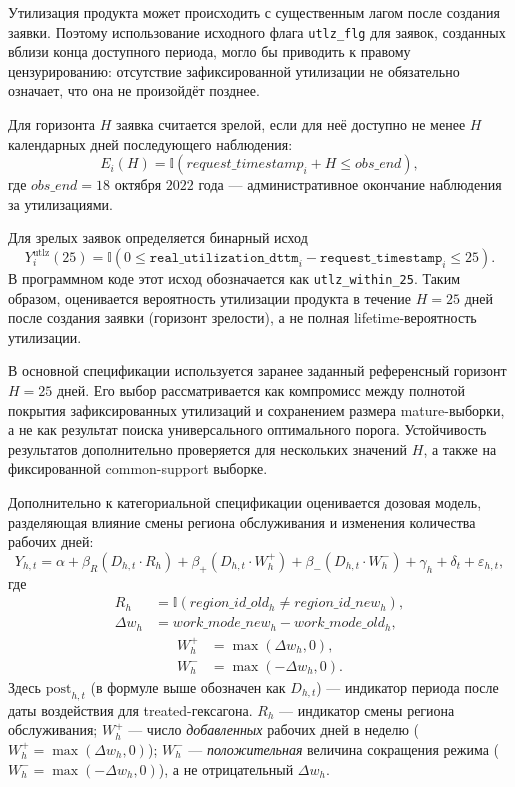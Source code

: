 \documentclass[14pt,a4paper]{extarticle}
\begin{document}
Утилизация продукта может происходить с существенным лагом после создания
заявки. Поэтому использование исходного флага \texttt{utlz\_flg} для заявок,
созданных вблизи конца доступного периода, могло бы приводить к правому
цензурированию: отсутствие зафиксированной утилизации не обязательно означает,
что она не произойдёт позднее.

Для горизонта \(H\) заявка считается зрелой, если для неё доступно не менее
\(H\) календарных дней последующего наблюдения:
\[
E_i(H)
=
\mathbb{I}
\left(
request\_timestamp_i + H
\leq obs\_end
\right),
\]
где \(obs\_end=\text{18 октября 2022 года}\) --- административное окончание
наблюдения за утилизациями.

Для зрелых заявок определяется бинарный исход
\[
Y_i^{\mathrm{utlz}}(25)
=
\mathbb{I}
\left(
0 \leq
\texttt{real\_utilization\_dttm}_i
-
\texttt{request\_timestamp}_i
\leq 25
\right).
\]
В программном коде этот исход обозначается как \texttt{utlz\_within\_25}. Таким образом, оценивается вероятность утилизации продукта в течение \(H=25\) дней после создания заявки (горизонт зрелости), а не полная lifetime-вероятность утилизации.

В основной спецификации используется заранее заданный референсный горизонт
\(H=25\) дней. Его выбор рассматривается как компромисс между полнотой
покрытия зафиксированных утилизаций и сохранением размера mature-выборки,
а не как результат поиска универсального оптимального порога. Устойчивость
результатов дополнительно проверяется для нескольких значений \(H\), а также
на фиксированной common-support выборке.

Дополнительно к категориальной спецификации оценивается дозовая модель, разделяющая влияние смены региона обслуживания и изменения количества рабочих дней:
\[
Y_{h,t}
=
\alpha
+
\beta_R(D_{h,t} \cdot R_h)
+
\beta_+(D_{h,t} \cdot W_h^+)
+
\beta_-(D_{h,t} \cdot W_h^-)
+
\gamma_h
+
\delta_t
+
\varepsilon_{h,t},
\]
где
\[
\begin{aligned}
R_h &= \mathbb{I}(region\_id\_old_h \neq region\_id\_new_h),\\
\Delta w_h &= work\_mode\_new_h - work\_mode\_old_h,
\end{aligned}
\]
\[
\begin{aligned}
W_h^+ &= \max(\Delta w_h,0),\\
W_h^- &= \max(-\Delta w_h,0).
\end{aligned}
\]
Здесь \(\mathrm{post}_{h,t}\) (в формуле выше обозначен как \(D_{h,t}\)) --- индикатор периода после даты воздействия для treated-гексагона.
\(R_h\) --- индикатор смены региона обслуживания; \(W_h^+\) --- число \emph{добавленных} рабочих дней в неделю (\(W_h^+=\max(\Delta w_h,0)\)); \(W_h^-\) --- \emph{положительная} величина сокращения режима (\(W_h^-=\max(-\Delta w_h,0)\)), а не отрицательный \(\Delta w_h\).
\end{document}
